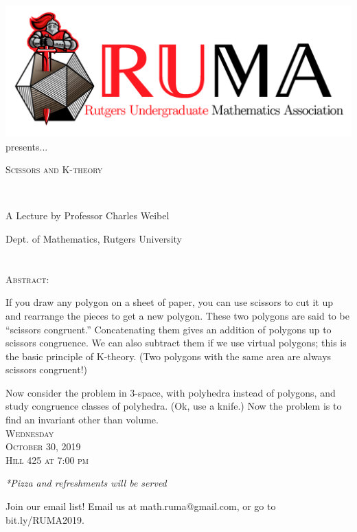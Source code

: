 \documentclass[12pt]{article}
\begin{document}

\begin{center}\includegraphics[scale=.40]{RUMAlogo.png}\\
presents... \\
\begin{spacing}{1}
{\fontsize{40}{44}\selectfont  \textsc{
Scissors and K-theory}} \end{spacing}
 

~~\\
\begin{spacing}{1.5}
{\fontsize{24}{24} \selectfont A Lecture by Professor Charles
  Weibel}  \end{spacing}
\large Dept. of Mathematics, Rutgers University \\~~\\
~~\\

\normalsize
\textsc{Abstract:}

\Large
If you draw any polygon on a sheet of paper, you can use scissors
to cut it up and rearrange the pieces to get a new polygon. These
two polygons are said to be ``scissors congruent.''  Concatenating
them gives an addition of polygons up to scissors congruence. We
can also subtract them if we use virtual polygons; this is the
basic principle of K-theory.  (Two polygons with the same area are
always scissors congruent!)

Now consider the problem in 3-space, with polyhedra instead
of polygons, and study congruence classes of polyhedra. (Ok, use a
knife.) Now the problem is to find an invariant other than volume.
\\

\vspace{10mm} 
\Huge   \textsc{Wednesday\\October 30, 2019 \\Hill 425 at 7:00
  pm}

\vspace{2mm}
\large
\emph{*Pizza and refreshments will be served}
\end{center}

\begin{center}
  \large  Join our email list! Email us at math.ruma@gmail.com, or
go to bit.ly/RUMA2019.\\
\end{center}
\end{document}
